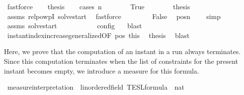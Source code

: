 \begin{isabellebody}
\ fastforce\isanewline
\ \ \isamarkupfalse%
\ {\isacharquery}thesis\isanewline
\ \ \isamarkupfalse%
\ {\isacharparenleft}cases\ {\isacartoucheopen}n\ {\isacharequal}\ {}{\isacartoucheclose}{\isacharparenright}\isanewline
\ \ \ \ \isamarkupfalse%
\ True\isanewline
\ \ \ \ \ \ \isamarkupfalse%
\ {\isacharquery}thesis\ \isamarkupfalse%
\ assms\ relpowp{\isacharunderscore}{}{\isacharunderscore}I\ solve{\isacharunderscore}start\ \isamarkupfalse%
\ fastforce\isanewline
\ \ \isamarkupfalse%
\isanewline
\ \ \ \ \isamarkupfalse%
\ False\ \isamarkupfalse%
\ pos{\isacharcolon}{\isacartoucheopen}n\ {\isachargreater}\ {}{\isacartoucheclose}\ \isamarkupfalse%
\ simp\isanewline
\ \ \ \ \ \ \isamarkupfalse%
\ assms\ solve{\isacharunderscore}start\ \isamarkupfalse%
\ {\isacartoucheopen}{\isasymrho}\ {\isasymin}\ {\isasymlbrakk}\ {\isacharbrackleft}{\isacharbrackright}{\isacharcomma}\ {}\ {\isasymturnstile}\ {\isasymPsi}\ {\isasymtriangleright}\ {\isacharbrackleft}{\isacharbrackright}\ {\isasymrbrakk}\isactrlsub c\isactrlsub o\isactrlsub n\isactrlsub f\isactrlsub i\isactrlsub g\ {\isacartoucheclose}\ \isamarkupfalse%
\ blast\isanewline
\ \ \ \ \ \ \isamarkupfalse%
\ instant{\isacharunderscore}index{\isacharunderscore}increase{\isacharunderscore}generalized{\isacharbrackleft}OF\ pos\ this{\isacharbrackright}\ \isamarkupfalse%
\ {\isacharquery}thesis\ \isamarkupfalse%
\ blast\isanewline
\ \ \isamarkupfalse%
\isanewline
{}\isamarkupfalse%
%
\endisatagproof
{\isafoldproof}%
%
\isadelimproof
%
\endisadelimproof
%
\isadelimdocument
%
\endisadelimdocument
%
\isatagdocument
%
\isamarkuptrue%
%
\endisatagdocument
{\isafolddocument}%
%
\isadelimdocument
%
\endisadelimdocument
%
\begin{isamarkuptext}%
Here, we prove that the computation of an instant in a run always terminates.
  Since this computation terminates when the list of constraints for the present
  instant becomes empty, we introduce a measure for this formula.%
\end{isamarkuptext}\isamarkuptrue%
\isamarkupfalse%
\ measure{\isacharunderscore}interpretation\ {\isacharcolon}{\isacharcolon}\ {\isacartoucheopen}{\isacharprime}{\isasymtau}{\isacharcolon}{\isacharcolon}linordered{\isacharunderscore}field\ TESL{\isacharunderscore}formula\ {\isasymRightarrow}\ nat{\isacartoucheclose}\ {\isacharparenleft}{\isacartoucheopen}{\isasymmu}{\isacartoucheclose}{\isacharparenright}\isanewline

\end{isabellebody}
